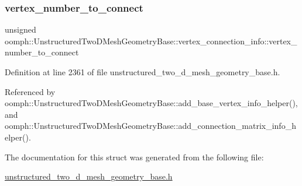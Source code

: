 \subsubsection{\texorpdfstring{vertex\+\_\+number\+\_\+to\+\_\+connect}{vertex\_number\_to\_connect}}
{\footnotesize\ttfamily unsigned oomph\+::\+Unstructured\+Two\+D\+Mesh\+Geometry\+Base\+::vertex\+\_\+connection\+\_\+info\+::vertex\+\_\+number\+\_\+to\+\_\+connect}



Definition at line 2361 of file unstructured\+\_\+two\+\_\+d\+\_\+mesh\+\_\+geometry\+\_\+base.\+h.



Referenced by oomph\+::\+Unstructured\+Two\+D\+Mesh\+Geometry\+Base\+::add\+\_\+base\+\_\+vertex\+\_\+info\+\_\+helper(), and oomph\+::\+Unstructured\+Two\+D\+Mesh\+Geometry\+Base\+::add\+\_\+connection\+\_\+matrix\+\_\+info\+\_\+helper().



The documentation for this struct was generated from the following file\+:\begin{DoxyCompactItemize}
\item 
\hyperlink{unstructured__two__d__mesh__geometry__base_8h}{unstructured\+\_\+two\+\_\+d\+\_\+mesh\+\_\+geometry\+\_\+base.\+h}\end{DoxyCompactItemize}
